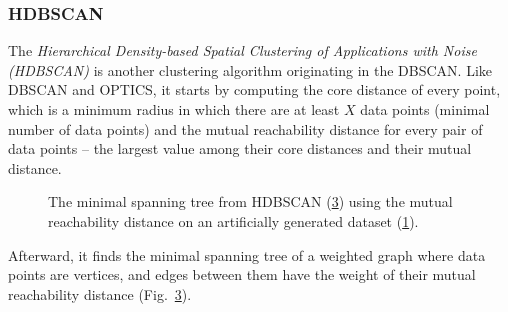 \subsubsection{HDBSCAN}
The \textit{Hierarchical Density-based Spatial Clustering of Applications with Noise (HDBSCAN)} \cite{vis:hdbscan} is another clustering algorithm originating in the DBSCAN. Like DBSCAN and OPTICS, it starts by computing the core distance of every point, which is a minimum radius in which there are at least $X$ data points (minimal number of data points) and the mutual reachability distance for every pair of data points -- the largest value among their core distances and their mutual distance.
\begin{figure}[ht]
     \centering
     \begin{subfigure}[b]{0.495\textwidth}
        \centering
        
        \caption{}
        \label{fig:hdbscan_dataset}
     \end{subfigure}
     \hfill
     \begin{subfigure}[b]{0.495\textwidth}
        \centering
        
        \caption{}
        \label{fig:hdbscan_tree}
     \end{subfigure}
    \caption{The minimal spanning tree from HDBSCAN (\ref{fig:hdbscan_tree}) using the mutual reachability distance on an artificially generated dataset (\ref{fig:hdbscan_dataset}).
    }
\end{figure}

Afterward, it finds the minimal spanning tree of a weighted graph where data points are vertices, and edges between them have the weight of their mutual reachability distance (Fig.~\ref{fig:hdbscan_tree}).

